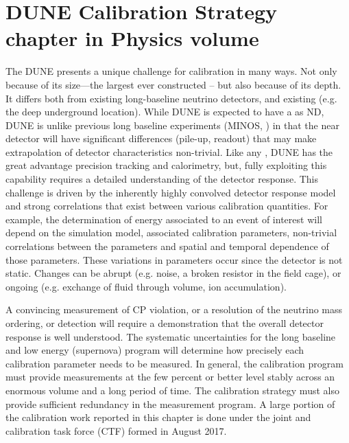 \chapter{DUNE Calibration Strategy chapter in Physics volume}
\label{ch:phys-calib-strat}

The DUNE  presents a unique challenge for calibration in many ways. Not only because of its size---the largest  ever constructed -- but also because of its depth. It differs both from existing long-baseline neutrino detectors, and existing  (e.g. the deep underground location). While DUNE is expected to have a  as ND, DUNE is unlike previous long baseline experiments (MINOS, ) in that the near detector will have significant differences (pile-up, readout) that may make extrapolation of detector characteristics non-trivial. 
Like any , DUNE has the great advantage precision tracking and calorimetry, but,  fully exploiting this capability requires a detailed understanding of the detector response. This challenge is driven by the inherently highly convolved detector response model and strong correlations that exist between various calibration quantities. For example, the determination of energy associated to an event of interest will depend on the simulation model, associated calibration parameters, non-trivial correlations between the parameters and spatial and temporal dependence of those parameters. These variations in parameters occur since the detector is not static. Changes can be abrupt (e.g. noise, a broken resistor in the field cage), or ongoing (e.g. exchange of fluid through volume, ion accumulation). 

A convincing measurement of CP violation, or a resolution of the neutrino mass ordering, or  detection will require a demonstration that the overall detector response is well understood. The systematic uncertainties for the long baseline and low energy (supernova) program will determine how precisely each calibration parameter needs to be measured. In general, the calibration program must provide measurements at the few percent or better level stably across an enormous volume and a long period of time. The calibration strategy must also provide sufficient redundancy in the measurement program. A large portion of the calibration work reported in this chapter is done under the joint  and  calibration task force (CTF) formed in August 2017.

